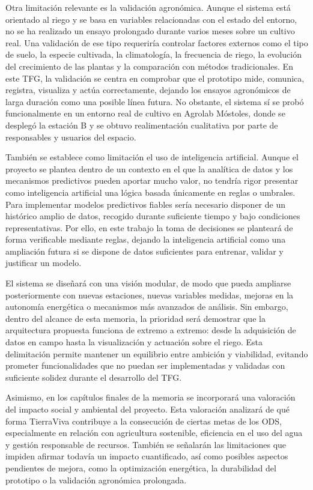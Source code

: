 Otra limitación relevante es la validación agronómica. Aunque el sistema está orientado al riego y se basa en variables relacionadas con el estado del entorno, no se ha realizado un ensayo prolongado durante varios meses sobre un cultivo real. Una validación de ese tipo requeriría controlar factores externos como el tipo de suelo, la especie cultivada, la climatología, la frecuencia de riego, la evolución del crecimiento de las plantas y la comparación con métodos tradicionales. En este TFG, la validación se centra en comprobar que el prototipo mide, comunica, registra, visualiza y actúa correctamente, dejando los ensayos agronómicos de larga duración como una posible línea futura. No obstante, el sistema sí se probó funcionalmente en un entorno real de cultivo en Agrolab Móstoles, donde se desplegó la estación B y se obtuvo realimentación cualitativa por parte de responsables y usuarios del espacio.

También se establece como limitación el uso de inteligencia artificial. Aunque el proyecto se plantea dentro de un contexto en el que la analítica de datos y los mecanismos predictivos pueden aportar mucho valor, no tendría rigor presentar como inteligencia artificial una lógica basada únicamente en reglas o umbrales. Para implementar modelos predictivos fiables sería necesario disponer de un histórico amplio de datos, recogido durante suficiente tiempo y bajo condiciones representativas. Por ello, en este trabajo la toma de decisiones se planteará de forma verificable mediante reglas, dejando la inteligencia artificial como una ampliación futura si se dispone de datos suficientes para entrenar, validar y justificar un modelo.

El sistema se diseñará con una visión modular, de modo que pueda ampliarse posteriormente con nuevas estaciones, nuevas variables medidas, mejoras en la autonomía energética o mecanismos más avanzados de análisis. Sin embargo, dentro del alcance de esta memoria, la prioridad será demostrar que la arquitectura propuesta funciona de extremo a extremo: desde la adquisición de datos en campo hasta la visualización y actuación sobre el riego. Esta delimitación permite mantener un equilibrio entre ambición y viabilidad, evitando prometer funcionalidades que no puedan ser implementadas y validadas con suficiente solidez durante el desarrollo del TFG.

Asimismo, en los capítulos finales de la memoria se incorporará una valoración del impacto social y ambiental del proyecto. Esta valoración analizará de qué forma TierraViva contribuye a la consecución de ciertas metas de los ODS, especialmente en relación con agricultura sostenible, eficiencia en el uso del agua y gestión responsable de recursos. También se señalarán las limitaciones que impiden afirmar todavía un impacto cuantificado, así como posibles aspectos pendientes de mejora, como la optimización energética, la durabilidad del prototipo o la validación agronómica prolongada.

